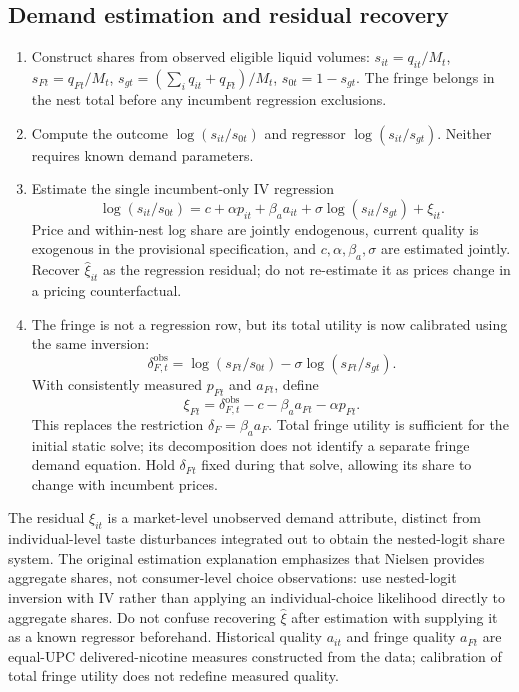 \documentclass[11pt]{article}
\begin{document}
\subsection*{Demand estimation and residual recovery}
\begin{enumerate}
\item Construct shares from observed eligible liquid volumes: $s_{it}=q_{it}/M_t$, $s_{Ft}=q_{Ft}/M_t$, $s_{gt}=(\sum_iq_{it}+q_{Ft})/M_t$, $s_{0t}=1-s_{gt}$. The fringe belongs in the nest total before any incumbent regression exclusions.
\item Compute the outcome $\log(s_{it}/s_{0t})$ and regressor $\log(s_{it}/s_{gt})$. Neither requires known demand parameters.
\item Estimate the single incumbent-only IV regression
\begin{equation}\label{eq:inversion}
\log(s_{it}/s_{0t})=c+\alpha p_{it}+\beta_a a_{it}+\sigma\log(s_{it}/s_{gt})+\xi_{it}.
\end{equation}
Price and within-nest log share are jointly endogenous, current quality is exogenous in the provisional specification, and $c,\alpha,\beta_a,\sigma$ are estimated jointly. Recover $\widehat\xi_{it}$ as the regression residual; do not re-estimate it as prices change in a pricing counterfactual.
\item The fringe is not a regression row, but its total utility is now calibrated using the same inversion:
\begin{equation}\label{eq:fringe}
\delta_{F,t}^{\mathrm{obs}}=\log(s_{Ft}/s_{0t})-\sigma\log(s_{Ft}/s_{gt}).
\end{equation}
With consistently measured $p_{Ft}$ and $a_{Ft}$, define
\[
\xi_{Ft}=\delta_{F,t}^{\mathrm{obs}}-c-\beta_a a_{Ft}-\alpha p_{Ft}.
\]
This replaces the restriction $\delta_F=\beta_a a_F$. Total fringe utility is sufficient for the initial static solve; its decomposition does not identify a separate fringe demand equation. Hold $\delta_{Ft}$ fixed during that solve, allowing its share to change with incumbent prices.
\end{enumerate}
The residual $\xi_{it}$ is a market-level unobserved demand attribute, distinct from individual-level taste disturbances integrated out to obtain the nested-logit share system. The original estimation explanation emphasizes that Nielsen provides aggregate shares, not consumer-level choice observations: use nested-logit inversion with IV rather than applying an individual-choice likelihood directly to aggregate shares. Do not confuse recovering $\widehat\xi$ after estimation with supplying it as a known regressor beforehand. Historical quality $a_{it}$ and fringe quality $a_{Ft}$ are equal-UPC delivered-nicotine measures constructed from the data; calibration of total fringe utility does not redefine measured quality.
\end{document}
